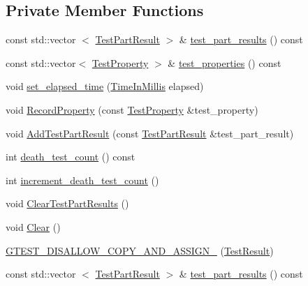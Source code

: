 \subsection*{\-Private \-Member \-Functions}
\begin{DoxyCompactItemize}
\item 
const std\-::vector\*
$<$ \hyperlink{classtesting_1_1TestPartResult}{\-Test\-Part\-Result} $>$ \& \hyperlink{classtesting_1_1TestResult_a28e61dc63de69ccf122b3a88890a2986}{test\-\_\-part\-\_\-results} () const 
\item 
const std\-::vector$<$ \hyperlink{classtesting_1_1TestProperty}{\-Test\-Property} $>$ \& \hyperlink{classtesting_1_1TestResult_abf01bb63648ec8989aebbdda6f198fe5}{test\-\_\-properties} () const 
\item 
void \hyperlink{classtesting_1_1TestResult_a0ca28ac81670a01fff5c6660e78065bb}{set\-\_\-elapsed\-\_\-time} (\hyperlink{namespacetesting_a338e9fd9474f0d8fafcb28b05f66a630}{\-Time\-In\-Millis} elapsed)
\item 
void \hyperlink{classtesting_1_1TestResult_aaeadbc79a8d2cc722ecffc52b03c3a08}{\-Record\-Property} (const \hyperlink{classtesting_1_1TestProperty}{\-Test\-Property} \&test\-\_\-property)
\item 
void \hyperlink{classtesting_1_1TestResult_a3fac5d4edaec29072c5e9d735434471a}{\-Add\-Test\-Part\-Result} (const \hyperlink{classtesting_1_1TestPartResult}{\-Test\-Part\-Result} \&test\-\_\-part\-\_\-result)
\item 
int \hyperlink{classtesting_1_1TestResult_a7471d1e687130ebf97805327c74bf216}{death\-\_\-test\-\_\-count} () const 
\item 
int \hyperlink{classtesting_1_1TestResult_ab32dced99547d83699c327dc67d45f96}{increment\-\_\-death\-\_\-test\-\_\-count} ()
\item 
void \hyperlink{classtesting_1_1TestResult_a56db858ea9f9b0de772699a2669a7ede}{\-Clear\-Test\-Part\-Results} ()
\item 
void \hyperlink{classtesting_1_1TestResult_aa71d36872f416feaa853788a7a7a7ef8}{\-Clear} ()
\item 
\hyperlink{classtesting_1_1TestResult_a7efb1b6292dd7621bbc29cee95b17f4c}{\-G\-T\-E\-S\-T\-\_\-\-D\-I\-S\-A\-L\-L\-O\-W\-\_\-\-C\-O\-P\-Y\-\_\-\-A\-N\-D\-\_\-\-A\-S\-S\-I\-G\-N\-\_\-} (\hyperlink{classtesting_1_1TestResult}{\-Test\-Result})
\item 
const std\-::vector\*
$<$ \hyperlink{classtesting_1_1TestPartResult}{\-Test\-Part\-Result} $>$ \& \hyperlink{classtesting_1_1TestResult_a28e61dc63de69ccf122b3a88890a2986}{test\-\_\-part\-\_\-results} () const 

\end{DoxyCompactItemize}
